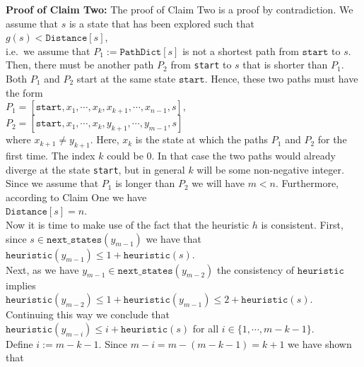 \noindent
\textbf{Proof of Claim Two:}  The proof of Claim Two is a proof by contradiction.  We assume that $s$ is a
state that has been explored such that 
\\[0.2cm]
\hspace*{1.3cm}
$g(s) < \mathtt{Distance}[s]$,
\\[0.2cm]
i.e.~we assume that $P_1 := \texttt{PathDict}[s]$ is not a shortest path from $\texttt{start}$ to $s$.  Then,
there must be another path $P_2$ from \texttt{start} to $s$ that is shorter than $P_1$.  Both $P_1$ and $P_2$
start at the same state $\texttt{start}$.  Hence, these two paths must have the form
\\[0.2cm]
\hspace*{1.3cm}
$P_1 = [\texttt{start},x_1,\cdots,x_k, x_{k+1},\cdots,x_{n-1},s]$,  \quad 
$P_2 = [\texttt{start},x_1,\cdots,x_k, y_{k+1},\cdots,y_{m-1},s]$ \quad 
\\[0.2cm]
where $x_{k+1} \not= y_{k+1}$.  Here, $x_k$ is the state at which the paths $P_1$ and $P_2$  for
the first time. The
index $k$ could be $0$.  In that case the two paths would already diverge at the state \texttt{start}, but in
general $k$ will be some non-negative integer.  Since we assume that $P_1$ is longer than $P_2$ we will have
$m < n$.  Furthermore, according to Claim One we have
\\[0.2cm]
\hspace*{1.3cm}
$\mathtt{Distance}[s] = n$.
\\[0.2cm]
Now it is time to make use of the fact that the heuristic $h$ is consistent.  First, since
$s \in \texttt{next\_states}(y_{m-1})$  we have that 
\\[0.2cm]
\hspace*{1.3cm}
$\texttt{heuristic}(y_{m-1}) \leq 1 + \texttt{heuristic}(s)$.
\\[0.2cm]
Next, as we have $y_{m-1} \in \texttt{next\_states}(y_{m-2})$ the consistency of $\texttt{heuristic}$ implies
\\[0.2cm]
\hspace*{1.3cm}
$\texttt{heuristic}(y_{m-2}) \leq 1 + \texttt{heuristic}(y_{m-1}) \leq 2 + \texttt{heuristic}(s)$.
\\[0.2cm]
Continuing this way we conclude that
\\[0.2cm]
\hspace*{1.3cm}
$\texttt{heuristic}(y_{m-i}) \leq i + \texttt{heuristic}(s)$  \quad for all $i\in\{1,\cdots,m-k-1\}$.
\\[0.2cm]
Define $i:= m - k - 1$.  Since $m-i = m - (m - k - 1) = k+1$ we have shown that
